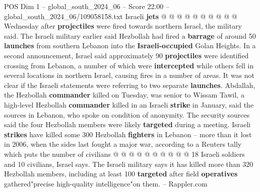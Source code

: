 \begin{textsample}{POS Dim 1 – global\_south\_2024\_06 – Score 22.00 – global\_south\_2024\_06/109058158.txt}
Israeli \textbf{jets} @ @ @ @ @ @ @ @ @ @ Wednesday after \textbf{projectiles} were fired towards northern Israel, the military said.
The Israeli military earlier said Hezbollah had fired a \textbf{barrage} of around 50 \textbf{launches} from southern Lebanon into the \textbf{Israeli-occupied} Golan Heights.
In a second announcement, Israel said approximately 90 \textbf{projectiles} were identified crossing from Lebanon, a number of which were \textbf{intercepted} while others fell in several locations in northern Israel, causing fires in a number of areas.
It was not clear if the Israeli statements were referring to two separate \textbf{launches}.
Abdallah, the Hezbollah \textbf{commander} killed on Tuesday, was senior to Wissam Tawil, a high-level Hezbollah \textbf{commander} killed in an Israeli \textbf{strike} in January, said the sources in Lebanon, who spoke on condition of anonymity.
The security sources said the four Hezbollah members were likely \textbf{targeted} during a meeting.
Israeli \textbf{strikes} have killed some 300 Hezbollah \textbf{fighters} in Lebanon -- more than it lost in 2006, when the sides last fought a major war, according to a Reuters tally which puts the number of civilians @ @ @ @ @ @ @ @ @ @ 18 Israeli soldiers and 10 civilians, Israel says.
The Israeli military says it has killed more than 320 Hezbollah members, including at least 100 \textbf{targeted} after field \textbf{operatives} gathered"precise high-quality intelligence"on them. -- Rappler.com

\end{textsample}
